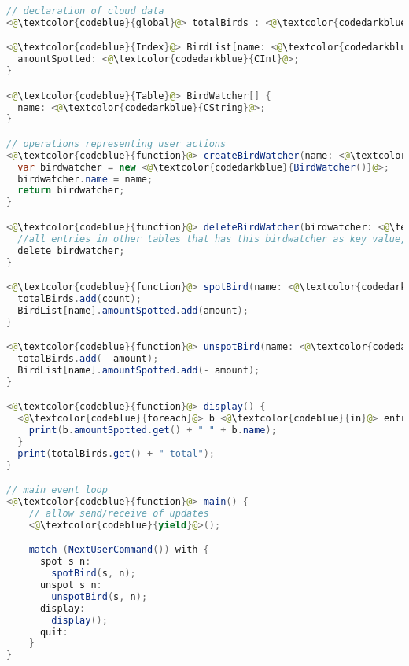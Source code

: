 %

\begin{lstlisting}[language=Java,caption={A simple birdwatching application implemented in a typed javascript-like pseudo-language},label={lst:birdwatching}]
// declaration of cloud data
<@\textcolor{codeblue}{global}@> totalBirds : <@\textcolor{codedarkblue}{CInt}@>;

<@\textcolor{codeblue}{Index}@> BirdList[name: <@\textcolor{codedarkblue}{String}@>] {
  amountSpotted: <@\textcolor{codedarkblue}{CInt}@>;
}

<@\textcolor{codeblue}{Table}@> BirdWatcher[] {
  name: <@\textcolor{codedarkblue}{CString}@>;
}

// operations representing user actions
<@\textcolor{codeblue}{function}@> createBirdWatcher(name: <@\textcolor{codedarkblue}{String}@>) {
  var birdwatcher = new <@\textcolor{codedarkblue}{BirdWatcher()}@>;
  birdwatcher.name = name;
  return birdwatcher;
}

<@\textcolor{codeblue}{function}@> deleteBirdWatcher(birdwatcher: <@\textcolor{codedarkblue}{BirdWatcher}@>) {
  //all entries in other tables that has this birdwatcher as key value, will also be deleted
  delete birdwatcher;
}

<@\textcolor{codeblue}{function}@> spotBird(name: <@\textcolor{codedarkblue}{String}@>, amount: <@\textcolor{codedarkblue}{Int}@>) {
  totalBirds.add(count);
  BirdList[name].amountSpotted.add(amount);
}

<@\textcolor{codeblue}{function}@> unspotBird(name: <@\textcolor{codedarkblue}{String}@>, amount: <@\textcolor{codedarkblue}{Int}@>) {
  totalBirds.add(- amount);
  BirdList[name].amountSpotted.add(- amount);
}

<@\textcolor{codeblue}{function}@> display() {
  <@\textcolor{codeblue}{foreach}@> b <@\textcolor{codeblue}{in}@> entries BirdList.amountSpotted {
    print(b.amountSpotted.get() + " " + b.name);
  }
  print(totalBirds.get() + " total");
}

// main event loop
<@\textcolor{codeblue}{function}@> main() {
    // allow send/receive of updates
    <@\textcolor{codeblue}{yield}@>();

    match (NextUserCommand()) with {
      spot s n:
        spotBird(s, n);
      unspot s n:
        unspotBird(s, n);
      display:
        display();
      quit:
    } 
}
\end{lstlisting}